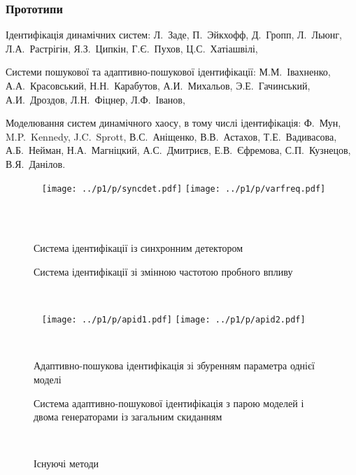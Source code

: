 \documentclass[14pt,handout,utf8]{beamer}
\newlength\TW
\newcommand{\Xhead}[1]{
 \begin{center}%
      \textbf{#1}%
 \end{center}%
}
\begin{document}

\begin{frame}
  \frametitle{Прототипи}

  \Xhead{}

  Ідентифікація динамічних систем:
  Л.~Заде,
  П.~Эйкхофф,
  Д.~Гропп,
  Л.~Льюнг,
  Л.А.~Растрігін,
  Я.З.~Ципкін,
  Г.Є.~Пухов,
  Ц.С.~Хатіашвілі,

  \vfill


Системи пошукової та адаптивно-пошукової ідентифікації:
  М.М.~Івахненко,
  А.А.~Красовський,
  Н.Н.~Карабутов,
  А.И.~Михальов,
  Э.Е.~Гачинський,
  А.И.~Дроздов,
  Л.Н.~Фіцнер,
  Л.Ф.~Іванов,

  \vfill

Моделювання систем динамічного хаосу, в тому числі ідентифікація:
  Ф.~Мун,
  M.P.~Kennedy,
  J.C.~Sprott,
  В.С.~Аніщенко,
  В.В.~Астахов,
  Т.Е.~Вадивасова,
  А.Б.~Нейман,
  Н.А.~Магніцкий,
  А.С.~Дмитриєв,
  Е.В.~Єфремова,
  С.П.~Кузнецов,
  В.Я.~Данілов.

  \begin{figure}
    \begin{center}
      ~ \hfill
      \texttt{[image: ../p1/p/syncdet.pdf]}
      \hfill
      \texttt{[image: ../p1/p/varfreq.pdf]}
      \hfill ~
    \end{center}
    \begin{center}
      ~ \hfill
      \parbox[t]{48\TW}{\centering Система ідентифікації із синхронним детектором}
      \hfill
      \parbox[t]{48\TW}{\centering Система ідентифікації зі змінною частотою пробного впливу}
      \hfill ~
    \end{center}
    \begin{center}
      ~ \hfill
      \texttt{[image: ../p1/p/apid1.pdf]}
      \hfill
      \texttt{[image: ../p1/p/apid2.pdf]}
      \hfill ~
    \end{center}
    \begin{center}
      ~ \hfill
      \parbox[t]{48\TW}{\centering Адаптивно-пошукова ідентифікація зі збуренням параметра однієї моделі}
      \hfill
      \parbox[t]{48\TW}{\centering Система адаптивно-пошукової ідентифікація з парою моделей і двома генераторами із загальним скиданням}
      \hfill ~
    \end{center}
    \label{atu:f:oldsch}
    \caption{Існуючі методи}
  \end{figure}



\end{frame}
\end{document}
